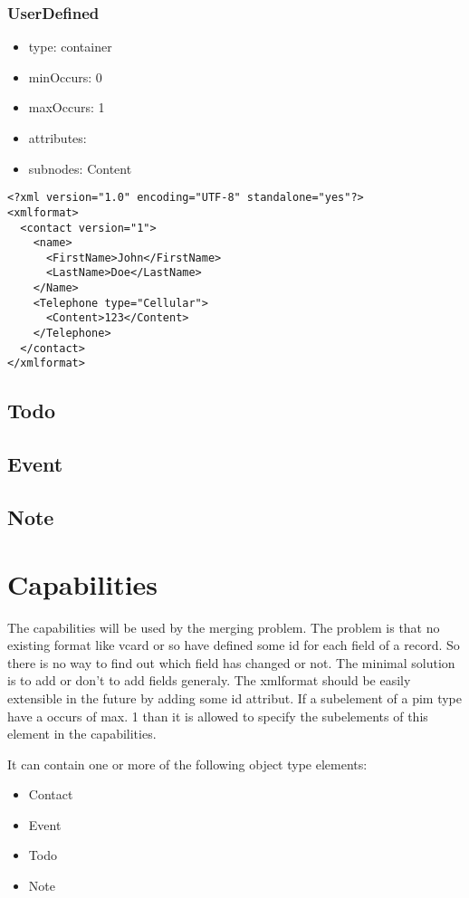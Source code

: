 \documentclass[a4paper,11pt]{article}
\begin{document}
\subsubsection{UserDefined}
\begin{itemize}
  \item type: container
  \item minOccurs: 0
  \item maxOccurs: 1
  \item attributes:
  \item subnodes:
  \subitem Content
\end{itemize}

\begin{lstlisting}
<?xml version="1.0" encoding="UTF-8" standalone="yes"?>
<xmlformat>
  <contact version="1">
    <name>
      <FirstName>John</FirstName>
      <LastName>Doe</LastName>
    </Name>
    <Telephone type="Cellular">
      <Content>123</Content>
    </Telephone>
  </contact>
</xmlformat>
\end{lstlisting}

\subsection{Todo}
\subsection{Event}
\subsection{Note}

\section{Capabilities}

The capabilities will be used by the merging problem. The problem is that no
existing format like vcard or so have defined some id for each field of a record.
So there is no way to find out which field has changed or not.
The minimal solution is to add or don't to add fields generaly.
The xmlformat should be easily extensible in the future by adding some id attribut.
If a subelement of a pim type have a occurs of max. 1 than it is allowed to
specify the subelements of this element in the capabilities.

It can contain one or more of the following object type elements:
\begin{itemize}
  \item Contact
  \item Event
  \item Todo
  \item Note
\end{itemize}
\end{document}
